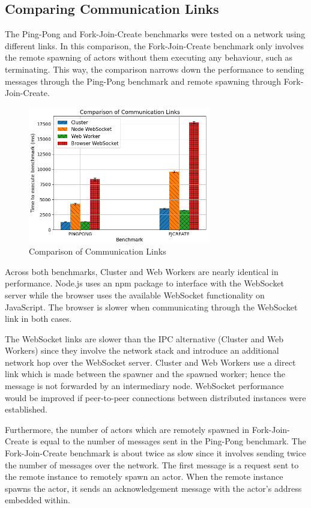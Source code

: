 \documentclass[oneside]{um-fict}
\begin{document}
\subsection{Comparing Communication Links}
The Ping-Pong and Fork-Join-Create benchmarks were tested on a network using different links. In this comparison, the Fork-Join-Create benchmark only involves the remote spawning of actors without them executing any behaviour, such as terminating. This way, the comparison narrows down the performance to sending messages through the Ping-Pong benchmark and remote spawning through Fork-Join-Create.
\begin{figure}[H]
    \begin{centering}
        \includegraphics[width=300px]{resources/link.png}
        \caption{Comparison of Communication Links}\label{fig:link}
    \end{centering}
\end{figure}
Across both benchmarks, Cluster and Web Workers are nearly identical in performance. Node.js uses an npm package to interface with the WebSocket server while the browser uses the available WebSocket functionality on JavaScript. The browser is slower when communicating through the WebSocket link in both cases. 

The WebSocket links are slower than the IPC alternative (Cluster and Web Workers) since they involve the network stack and introduce an additional network hop over the WebSocket server. Cluster and Web Workers use a direct link which is made between the spawner and the spawned worker; hence the message is not forwarded by an intermediary node. WebSocket performance would be improved if peer-to-peer connections between distributed instances were established.

Furthermore, the number of actors which are remotely spawned in Fork-Join-Create is equal to the number of messages sent in the Ping-Pong benchmark. The Fork-Join-Create benchmark is about twice as slow since it involves sending twice the number of messages over the network. The first message is a request sent to the remote instance to remotely spawn an actor. When the remote instance spawns the actor, it sends an acknowledgement message with the actor's address embedded within.
\end{document}
